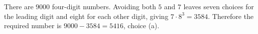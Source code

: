 There are $9000$ four-digit numbers. Avoiding both $5$ and $7$ leaves seven choices for the leading digit and eight for each other digit, giving $7\cdot8^3=3584$. Therefore the required number is $9000-3584=\boxed{5416}$, choice (a).
